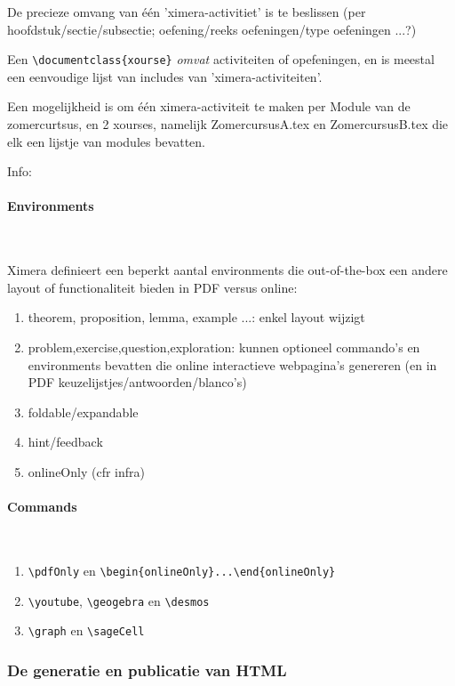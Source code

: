\documentclass{ximera}
\begin{document}
De precieze omvang van één 'ximera-activitiet' is te beslissen (per hoofdstuk/sectie/subsectie; oefening/reeks oefeningen/type oefeningen ...?)

Een \verb|\documentclass{xourse}| \textit{omvat}  activiteiten of opefeningen, en is meestal een eenvoudige lijst van includes van 'ximera-activiteiten'. 

Een mogelijkheid is om één ximera-activiteit te maken per Module van de zomercurtsus, en 2 xourses, namelijk ZomercursusA.tex en ZomercursusB.tex die elk een lijstje van modules bevatten.


Info: 

\paragraph{Environments} \ 

Ximera definieert een beperkt aantal environments die out-of-the-box een andere layout of functionaliteit bieden in PDF versus online:
\begin{enumerate}
    \item theorem, proposition, lemma, example ...: enkel layout wijzigt
    \item problem,exercise,question,exploration: kunnen optioneel commando's en environments bevatten die online interactieve webpagina's genereren (en in PDF keuzelijstjes/antwoorden/blanco's)
    \item foldable/expandable
    \item hint/feedback
    \item onlineOnly (cfr infra)
\end{enumerate}
    
\paragraph{Commands} \ 

\begin{enumerate}
    \item \verb|\pdfOnly| en \verb|\begin{onlineOnly}...\end{onlineOnly}|
    \item \verb|\youtube|, \verb|\geogebra|  en \verb|\desmos|
    \item \verb|\graph| en \verb|\sageCell|
\end{enumerate}


\subsubsection{De generatie en publicatie van HTML}
\end{document}
